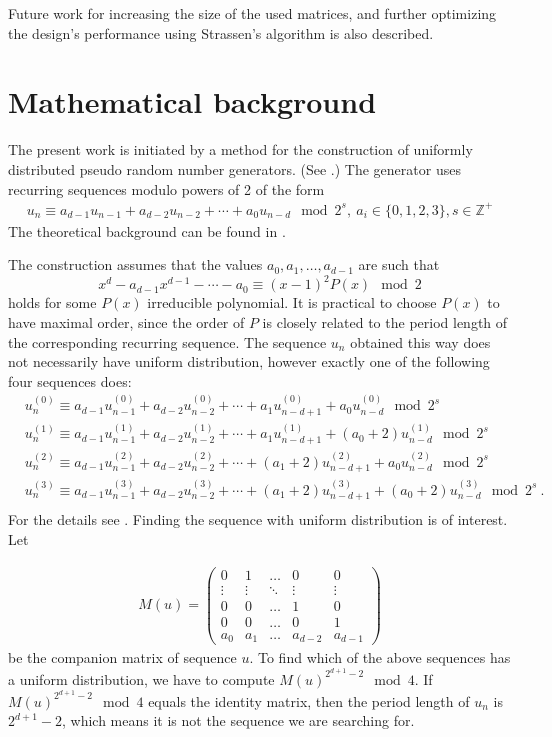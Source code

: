 \documentclass[11pt,twoside]{article}
\begin{document}
Future work for increasing the size of the used matrices, and further optimizing the design's performance using Strassen's algorithm is also described.

\section{Mathematical background}

The present work is initiated by a method for the construction of uniformly distributed pseudo random number generators. (See \cite{c7}.) The generator uses recurring sequences modulo powers of 2 of the form
\begin{align*}
u_n \equiv a_{d-1}u_{n-1}+a_{d-2}u_{n-2}+\cdots+a_{0}u_{n-d} \mod{2^s}, \  a_i \in \{0,1,2,3\}, s \in \mathbb{Z}^+
\end{align*}
The theoretical background can be found in \cite{c6}.

The construction assumes that the values $a_0,a_1,\ldots,a_{d-1}$ are such that
\[
x^{d}-a_{d-1}x^{d-1}-\cdots-a_0 \equiv (x-1)^{2}P(x) \mod{2}
\]
holds for some $P(x)$ irreducible polynomial. It is practical to choose $P(x)$ to have maximal order, since the order of $P$ is closely related to the period length of the corresponding recurring sequence.
The sequence $u_n$ obtained this way does not necessarily have uniform distribution, however exactly one of the following four sequences does:
\begin{align*}
&u_n^{(0)}\equiv a_{d-1}u_{n-1}^{(0)}+a_{d-2}u_{n-2}^{(0)}+\cdots+a_{1}u_{n-d+1}^{(0)}+a_{0}u_{n-d}^{(0)} \mod{2^s}\\
&u_n^{(1)}\equiv a_{d-1}u_{n-1}^{(1)}+a_{d-2}u_{n-2}^{(1)}+\cdots+a_{1}u_{n-d+1}^{(1)}+(a_{0}+2)u_{n-d}^{(1)} \mod{2^s}\\
&u_n^{(2)}\equiv a_{d-1}u_{n-1}^{(2)}+a_{d-2}u_{n-2}^{(2)}+\cdots+(a_{1}+2)u_{n-d+1}^{(2)}+a_{0}u_{n-d}^{(2)} \mod{2^s}\\
&u_n^{(3)}\equiv a_{d-1}u_{n-1}^{(3)}+a_{d-2}u_{n-2}^{(3)}+\cdots+(a_{1}+2)u_{n-d+1}^{(3)}+(a_{0}+2)u_{n-d}^{(3)} \mod{2^s} \ .\\
\end{align*}
For the details see \cite{c7}. Finding the sequence with uniform distribution is of interest. 
Let

\begin{align*}
M(u)=
\left(
\begin{matrix}
0 & 1 & \hdots & 0 & 0 \\
\vdots & \vdots & \ddots & \vdots & \vdots \\
0 & 0 & \hdots & 1 & 0 \\
0 & 0 & \hdots & 0 & 1 \\
a_0 & a_1 & \hdots & a_{d-2} & a_{d-1}
\end{matrix}
\right)
\end{align*}
be the companion matrix of sequence $u$. To find which of the above sequences has a uniform distribution, we have to compute $M(u)^{2^{d+1}-2}\mod 4$. If $M(u)^{2^{d+1}-2}\mod 4$ equals the identity matrix, then the period length of $u_n$ is $2^{d+1}-2$, which means it is not the sequence we are searching for.
\end{document}
